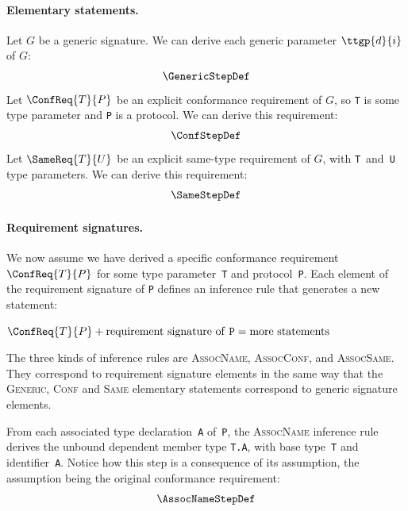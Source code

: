 \documentclass[../generics]{subfiles}
\begin{document}
\paragraph{Elementary statements.}
Let $G$ be a generic signature. We can derive each generic parameter $\ttgp{d}{i}$ of $G$:
\begin{gather*}
\GenericStepDef
\end{gather*}
Let $\ConfReq{T}{P}$ be an explicit conformance requirement of $G$, so \texttt{T} is some type parameter and \texttt{P} is a protocol. We can derive this requirement:
\begin{gather*}
\ConfStepDef
\end{gather*}
Let $\SameReq{T}{U}$ be an explicit same-type requirement of $G$, with \texttt{T}~and~\texttt{U} type parameters. We can derive this requirement:
\begin{gather*}
\SameStepDef
\end{gather*}

\paragraph{Requirement signatures.}
We now assume we have derived a specific conformance requirement $\ConfReq{T}{P}$ for some type parameter~\texttt{T} and protocol~\texttt{P}. Each element of the requirement signature of \texttt{P} defines an inference rule that generates a new statement:
\begin{center}
$\ConfReq{T}{P} + \text{requirement signature of \texttt{P}} = \text{more statements}$
\end{center}
The three kinds of inference rules are \textsc{AssocName}, \textsc{AssocConf}, and \textsc{AssocSame}. They correspond to requirement signature elements in the same way that the \textsc{Generic}, \textsc{Conf} and \textsc{Same} elementary statements correspond to generic signature elements.

From each associated type declaration~\texttt{A} of~\texttt{P}, the \textsc{AssocName} inference rule derives the unbound dependent member type \texttt{T.A}, with base type~\texttt{T} and identifier~\texttt{A}. Notice how this step is a consequence of its assumption, the assumption being the original conformance requirement:
\begin{gather*}
\AssocNameStepDef
\end{gather*}
\end{document}
